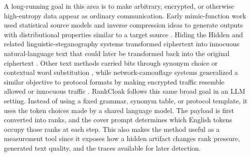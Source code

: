 \documentclass[fleqn,10pt]{wlscirep}
\begin{document}
A long-running goal in this area is to make arbitrary, encrypted, or otherwise high-entropy data appear as ordinary communication. Early mimic-function work used statistical source models and inverse compression ideas to generate outputs with distributional properties similar to a target source \cite{Wayner1992MimicFunctions,Wayner1995StrongTheoreticalSteganography}. Hiding the Hidden and related linguistic-steganography systems transformed ciphertext into innocuous natural-language text that could later be transformed back into the original ciphertext \cite{ChapmanDavida1997HidingHidden,Bennett2004LinguisticSteganography}. Other text methods carried bits through synonym choice or contextual word substitution \cite{ChangClark2014PracticalLinguisticSteganography}, while network-camouflage systems generalized a similar objective to protocol formats by making encrypted traffic resemble allowed or innocuous traffic \cite{Weinberg2012StegoTorus,Dyer2013FormatTransformingEncryption}. RankCloak follows this same broad goal in an LLM setting. Instead of using a fixed grammar, synonym table, or protocol template, it uses the token choices made by a shared language model. The payload is first converted into ranks, and the cover prompt determines which English tokens occupy those ranks at each step. This also makes the method useful as a measurement tool since it exposes how a hidden artifact changes rank pressure, generated text quality, and the traces available for later detection.
\end{document}
